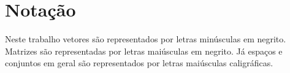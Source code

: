 %

\chapter*{Notação}

Neste trabalho vetores são representados por letras minúsculas em
negrito. Matrizes são representadas por letras maiúsculas em negrito.
Já espaços e conjuntos em geral são representados por letras maiúsculas
caligráficas. %

